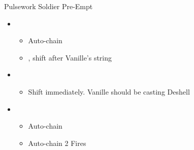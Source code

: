 \begin{battle}[0:20]{Pulsework Soldier Pre-Empt}
	\begin{itemize}
		\item \first
		      \begin{itemize}
			      \item Auto-chain
			      \item \stagger, shift after Vanille's string
		      \end{itemize}
		\item \fourth
		      \begin{itemize}
			      \item Shift immediately. Vanille should be casting Deshell
		      \end{itemize}
		\item \first
		      \begin{itemize}
			      \item Auto-chain
			      \item Auto-chain 2 Fires
		      \end{itemize}
	\end{itemize}
\end{battle}


